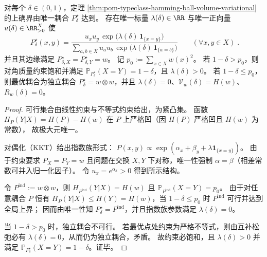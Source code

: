 \begin{theorem}[唯一极大耦合与指数族结构]\label{thm:pom-typeclass-hamming-ball-unique-maximizer-exponential-family}
对每个 \(\delta\in(0,1)\)，定理 \ref{thm:pom-typeclass-hamming-ball-volume-variational} 的上确界由唯一耦合 \(P^\star_\delta\) 达到。
存在唯一标量 \(\lambda(\delta)\in\RR\) 与唯一正向量 \(u(\delta)\in\RR_{>0}^{X}\) 使
\[
\boxed{\;
P^\star_\delta(x,y)
=
\frac{u_xu_y\,\exp\!\bigl(\lambda(\delta)\,\mathbf 1_{\{x=y\}}\bigr)}
{\sum_{a,b\in X}u_au_b\,\exp\!\bigl(\lambda(\delta)\,\mathbf 1_{\{a=b\}}\bigr)}\qquad(\forall x,y\in X)\; }.
\]
并且其边缘满足 \(P^\star_{\delta,X}=P^\star_{\delta,Y}=w\)。
记 \(p_0:=\sum_{x\in X}w(x)^2\)。
若 \(1-\delta>p_0\)，则对角质量约束饱和并满足 \(\mathbb P_{P^\star_\delta}(X=Y)=1-\delta\)，且 \(\lambda(\delta)>0\)。
若 \(1-\delta\le p_0\)，则最优耦合为独立耦合 \(P^\star_\delta=w\otimes w\)，并且 \(\lambda(\delta)=0\)、\(\mathcal V_w(\delta)=H(w)\)、\(R_w(\delta)=0\)。
\end{theorem}
\begin{proof}
可行集合由线性约束与不等式约束给出，为紧凸集。
函数 \(H_P(Y|X)=H(P)-H(w)\) 在 \(P\) 上严格凹（因 \(H(P)\) 严格凹且 \(H(w)\) 为常数），
故极大元唯一。
\par
对偶化（KKT）给出指数族形式：
\(
P(x,y)\propto \exp(\alpha_x+\beta_y+\lambda\mathbf 1_{\{x=y\}})
\)。
由于约束要求 \(P_X=P_Y=w\) 且问题在交换 \(X,Y\) 下对称，唯一性强制 \(\alpha=\beta\)（相差常数可并入归一化因子）。
令 \(u_x=e^{\alpha_x}>0\) 得到所示结构。
\par
令 \(P^{\mathrm{ind}}:=w\otimes w\)，则 \(H_{P^{\mathrm{ind}}}(Y|X)=H(w)\) 且 \(\mathbb P_{P^{\mathrm{ind}}}(X=Y)=p_0\)。
由于对任意耦合 \(P\) 恒有 \(H_P(Y|X)\le H(Y)=H(w)\)，当 \(1-\delta\le p_0\) 时 \(P^{\mathrm{ind}}\) 可行并达到全局上界；
因而由唯一性知 \(P^\star_\delta=P^{\mathrm{ind}}\)，并且指数族参数满足 \(\lambda(\delta)=0\)。
\par
当 \(1-\delta>p_0\) 时，独立耦合不可行。
若最优点处约束为严格不等式，则由互补松弛必有 \(\lambda(\delta)=0\)，从而仍为独立耦合，矛盾。
故约束必饱和，且 \(\lambda(\delta)>0\) 并满足 \(\mathbb P_{P^\star_\delta}(X=Y)=1-\delta\)。证毕。
\end{proof}

